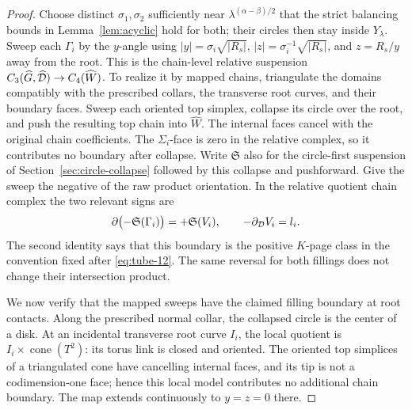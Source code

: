 \begin{proof}
Choose distinct \(\sigma_1,\sigma_2\) sufficiently near
\(\lambda^{(\alpha-\beta)/2}\) that the strict balancing bounds
in Lemma~\ref{lem:acyclic} hold for both; their circles then stay
inside \(Y_\lambda\).
Sweep each \(\Gamma_i\) by the \(y\)-angle
using \(|y|=\sigma_i\sqrt{|R_s|}\),
\(|z|=\sigma_i^{-1}\sqrt{|R_s|}\), and \(z=R_s/y\)
away from the root.
This is the chain-level relative suspension
\(C_3(\widehat G,\widehat{\mathcal D})\to C_4(\widehat W)\).
To realize it by mapped chains, triangulate the domains compatibly
with the prescribed collars, the transverse root curves, and their
boundary faces. Sweep each oriented top simplex, collapse its
circle over the root, and push the resulting top chain into
\(\widehat W\). The internal faces cancel with the original
chain coefficients. The \(\Sigma_i\)-face is zero in the relative
complex, so it contributes no boundary after collapse.
Write \(\mathfrak S\) also for the circle-first suspension of
Section~\ref{sec:circle-collapse} followed by this collapse and
pushforward. Give the sweep the negative of the raw product
orientation. In the relative quotient chain complex the two
relevant signs are
\[
 \partial\bigl(-\mathfrak S(\Gamma_i)\bigr)
    =+\mathfrak S(V_i),\qquad
 -\partial_{\mathcal D}V_i=l_i.
\]
The second identity says that this boundary is the positive
\(K\)-page class in the convention fixed after \eqref{eq:tube-12}.
The same reversal for both fillings does not change their
intersection product.

We now verify that the mapped sweeps have the claimed filling
boundary at root contacts.
Along the prescribed normal collar,
the collapsed circle is the center of a disk. At an incidental
transverse root curve \(I_i\), the local quotient is
\(I_i\times\operatorname{cone}(T^2)\): its torus link is closed
and oriented. The oriented top simplices of a triangulated cone
have cancelling internal faces, and its tip is not a
codimension-one face; hence this local model contributes no
additional chain boundary.
The map extends continuously to \(y=z=0\) there.


\end{proof}

